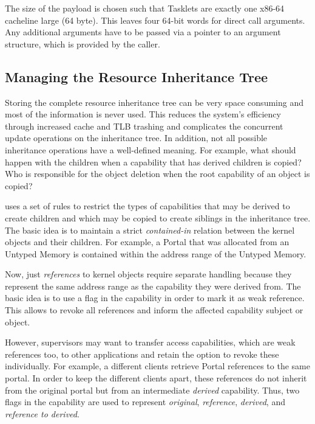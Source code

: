 The size of the payload is chosen such that Tasklets are exactly one x86-64 cacheline large (64 byte). This leaves four 64-bit words for direct call arguments. Any additional arguments have to be passed via a pointer to an argument structure, which is provided by the caller.

\subsection{Managing the Resource Inheritance Tree}
\label{sec:capability-impl}

Storing the complete resource inheritance tree can be very space consuming and most of the information is never used. This reduces the system's efficiency through increased cache and TLB trashing and complicates the concurrent update operations on the inheritance tree. In addition, not all possible inheritance operations have a well-defined meaning. For example, what should happen with the children when a capability that has derived children is copied? Who is responsible for the object deletion when the root capability of an object is copied?

\mythos uses a set of rules to restrict the types of capabilities that may be derived to create children and which may be copied to create siblings in the inheritance tree. The basic idea is to maintain a strict \emph{contained-in} relation between the kernel objects and their children. For example, a Portal that was allocated from an Untyped Memory is contained within the address range of the Untyped Memory.

Now, just \emph{references} to kernel objects require separate handling because they represent the same address range as the capability they were derived from. The basic idea is to use a flag in the capability in order to mark it as weak reference. This allows to revoke all references and inform the affected capability subject or object.

However, supervisors may want to transfer access capabilities, which are weak references too, to other applications and retain the option to revoke these individually. For example, a different clients retrieve Portal references to the same portal. In order to keep the different clients apart, these references do not inherit from the original portal but from an intermediate \emph{derived} capability. 
Thus, two flags in the capability are used to represent \emph{original}, \emph{reference}, \emph{derived}, and \emph{reference to derived}. 

